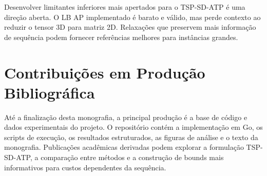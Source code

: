 Desenvolver limitantes inferiores mais apertados para o \ac{TSP-SD-ATP} é uma direção aberta. O \ac{LB} \ac{AP} implementado é barato e válido, mas perde contexto ao reduzir o tensor 3D para matriz 2D. Relaxações que preservem mais informação de sequência podem fornecer referências melhores para instâncias grandes.

\section{Contribuições em Produção Bibliográfica}

Até a finalização desta monografia, a principal produção é a base de código e dados experimentais do projeto. O repositório contém a implementação em Go, os scripts de execução, os resultados estruturados, as figuras de análise e o texto da monografia. Publicações acadêmicas derivadas podem explorar a formulação \ac{TSP-SD-ATP}, a comparação entre métodos e a construção de bounds mais informativos para custos dependentes da sequência.
